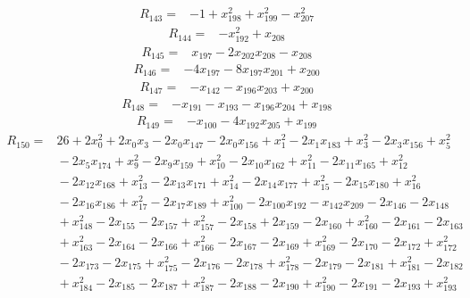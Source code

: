 \begin{align*}
R_{143}={}& -1 + x_{198}^{2} + x_{199}^{2} - x_{207}^{2}
\end{align*}
\begin{align*}
R_{144}={}& -x_{192}^{2} + x_{208}
\end{align*}
\begin{align*}
R_{145}={}& x_{197} - 2x_{202}x_{208} - x_{208}
\end{align*}
\begin{align*}
R_{146}={}& -4x_{197} - 8x_{197}x_{201} + x_{200}
\end{align*}
\begin{align*}
R_{147}={}& -x_{142} - x_{196}x_{203} + x_{200}
\end{align*}
\begin{align*}
R_{148}={}& -x_{191} - x_{193} - x_{196}x_{204} + x_{198}
\end{align*}
\begin{align*}
R_{149}={}& -x_{100} - 4x_{192}x_{205} + x_{199}
\end{align*}
\begin{align*}
R_{150}={}& 26 + 2x_{0}^{2} + 2x_{0}x_{3} - 2x_{0}x_{147} - 2x_{0}x_{156} + x_{1}^{2} - 2x_{1}x_{183} + x_{3}^{2} - 2x_{3}x_{156} + x_{5}^{2} \\
&{} - 2x_{5}x_{174} + x_{9}^{2} - 2x_{9}x_{159} + x_{10}^{2} - 2x_{10}x_{162} + x_{11}^{2} - 2x_{11}x_{165} + x_{12}^{2} \\
&{} - 2x_{12}x_{168} + x_{13}^{2} - 2x_{13}x_{171} + x_{14}^{2} - 2x_{14}x_{177} + x_{15}^{2} - 2x_{15}x_{180} + x_{16}^{2} \\
&{} - 2x_{16}x_{186} + x_{17}^{2} - 2x_{17}x_{189} + x_{100}^{2} - 2x_{100}x_{192} - x_{142}x_{209} - 2x_{146} - 2x_{148} \\
&{} + x_{148}^{2} - 2x_{155} - 2x_{157} + x_{157}^{2} - 2x_{158} + 2x_{159} - 2x_{160} + x_{160}^{2} - 2x_{161} - 2x_{163} \\
&{} + x_{163}^{2} - 2x_{164} - 2x_{166} + x_{166}^{2} - 2x_{167} - 2x_{169} + x_{169}^{2} - 2x_{170} - 2x_{172} + x_{172}^{2} \\
&{} - 2x_{173} - 2x_{175} + x_{175}^{2} - 2x_{176} - 2x_{178} + x_{178}^{2} - 2x_{179} - 2x_{181} + x_{181}^{2} - 2x_{182} \\
&{} + x_{184}^{2} - 2x_{185} - 2x_{187} + x_{187}^{2} - 2x_{188} - 2x_{190} + x_{190}^{2} - 2x_{191} - 2x_{193} + x_{193}^{2}
\end{align*}
